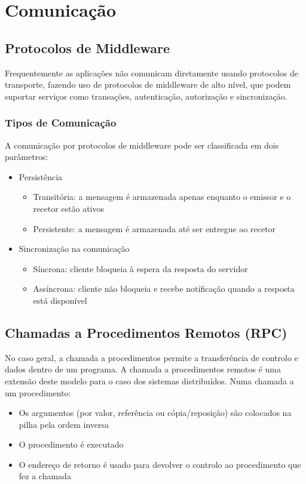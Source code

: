 \documentclass[10pt,a4paper]{report}
\begin{document}
\chapter{Comunicação}
\section{Protocolos de Middleware}
Frequentemente as aplicações não comunicam diretamente usando protocolos de transporte, fazendo uso de protocolos de middleware de alto nível, que podem suportar serviços como transações, autenticação, autorização e sincronização.
\subsection{Tipos de Comunicação}
A comunicação por protocolos de middleware pode ser classificada em dois parâmetros:
\begin{itemize}
\item Persistência
\begin{itemize}
\item Transitória: a mensagem é armazenada apenas enquanto o emissor e o recetor estão ativos
\item Persistente: a mensagem é armazenada até ser entregue ao recetor
\end{itemize}
\item Sincronização na comunicação
\begin{itemize}
\item Síncrona: cliente bloqueia à espera da resposta do servidor
\item Assíncrona: cliente não bloqueia e recebe notificação quando a resposta está disponível
\end{itemize}
\end{itemize}
\section{Chamadas a Procedimentos Remotos (RPC)}
No caso geral, a chamada a procedimentos permite a transferência de controlo e dados dentro de um programa. A chamada a procedimentos remotos é uma extensão deste modelo para o caso dos sistemas distribuídos. Numa chamada a um procedimento:
\begin{itemize}
\item Os argumentos (por valor, referência ou cópia/reposição) são colocados na pilha pela ordem inversa
\item O procedimento é executado
\item O endereço de retorno é usado para devolver o controlo ao procedimento que fez a chamada
\end{itemize}
\end{document}

